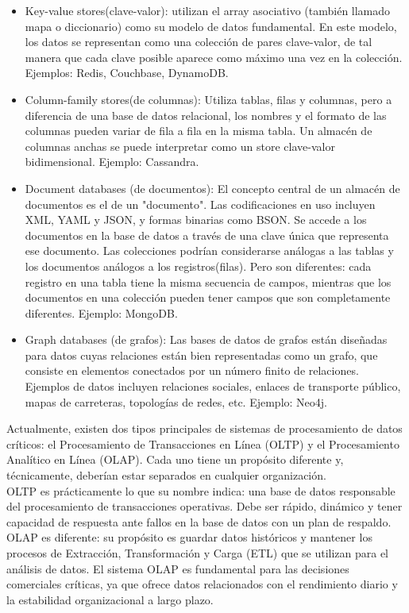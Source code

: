 \documentclass[12pt]{book}
\begin{document}
\begin{itemize}
    \item Key-value stores(clave-valor): utilizan el array asociativo (también llamado mapa o diccionario) como su modelo de datos fundamental. En este modelo, los datos se representan como una colección de pares clave-valor, de tal manera que cada clave posible aparece como máximo una vez en la colección. Ejemplos: Redis, Couchbase, DynamoDB.
    \item Column-family stores(de columnas): Utiliza tablas, filas y columnas, pero a diferencia de una base de datos relacional, los nombres y el formato de las columnas pueden variar de fila a fila en la misma tabla. Un almacén de columnas anchas se puede interpretar como un store clave-valor bidimensional. Ejemplo: Cassandra.
    \item Document databases (de documentos): El concepto central de un almacén de documentos es el de un "documento". Las codificaciones en uso incluyen XML, YAML y JSON, y formas binarias como BSON. Se accede a los documentos en la base de datos a través de una clave única que representa ese documento. Las colecciones podrían considerarse análogas a las tablas y los documentos análogos a los registros(filas). Pero son diferentes: cada registro en una tabla tiene la misma secuencia de campos, mientras que los documentos en una colección pueden tener campos que son completamente diferentes. Ejemplo: MongoDB.
    \item Graph databases (de grafos): Las bases de datos de grafos están diseñadas para datos cuyas relaciones están bien representadas como un grafo, que consiste en elementos conectados por un número finito de relaciones. Ejemplos de datos incluyen relaciones sociales, enlaces de transporte público, mapas de carreteras, topologías de redes, etc. Ejemplo: Neo4j.
\end{itemize}

Actualmente, existen dos tipos principales de sistemas de procesamiento de datos críticos: el Procesamiento de Transacciones en Línea (OLTP) y el Procesamiento Analítico en Línea (OLAP). Cada uno tiene un propósito diferente y, técnicamente, deberían estar separados en cualquier organización.\\
OLTP es prácticamente lo que su nombre indica: una base de datos responsable del procesamiento de transacciones operativas. Debe ser rápido, dinámico y tener capacidad de respuesta ante fallos en la base de datos con un plan de respaldo.\\
OLAP es diferente: su propósito es guardar datos históricos y mantener los procesos de Extracción, Transformación y Carga (ETL) que se utilizan para el análisis de datos. El sistema OLAP es fundamental para las decisiones comerciales críticas, ya que ofrece datos relacionados con el rendimiento diario y la estabilidad organizacional a largo plazo.\\
\end{document}
